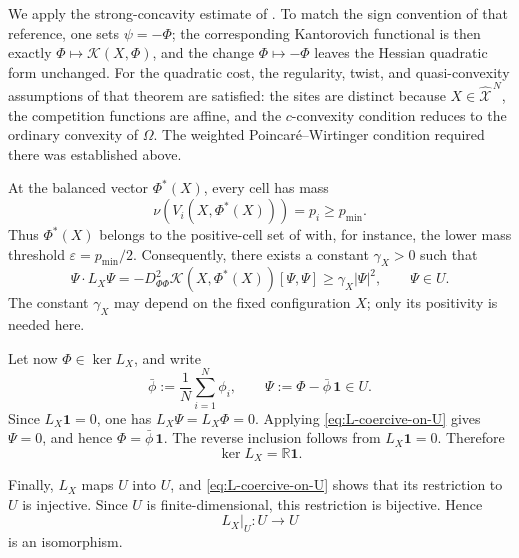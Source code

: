 \documentclass[11pt]{article}
\def\R{\mathbb{R}}
\def\Xc{{\mathcal X}}
\def\hX{\widehat{\Xc}^{\,N}}
\newcommand{\one}{\mathbf 1}
\newcommand{\Kant}{\mathscr K}
\newcommand{\pmin}{p_{\min}}
\theoremstyle{definition}
\theoremstyle{remark}
\numberwithin{equation}{section}
\begin{document}
We apply the strong-concavity estimate of
\cite[Theorem~5.1]{KitagawaMerigotThibert2019}.  To match the sign
convention of that reference, one sets $\psi=-\Phi$; the corresponding
Kantorovich functional is then exactly
$\Phi\mapsto\Kant(X,\Phi)$, and the change $\Phi\mapsto-\Phi$ leaves
the Hessian quadratic form unchanged.  For the quadratic cost, the
regularity, twist, and quasi-convexity assumptions of that theorem are
satisfied: the sites are distinct because $X\in\hX$, the competition
functions are affine, and the $c$-convexity condition reduces to the
ordinary convexity of $\Omega$.  The weighted
Poincar\'e--Wirtinger condition required there was established above.

At the balanced vector $\Phi^*(X)$, every cell has mass
\[
 \nu(V_i(X,\Phi^*(X)))=p_i\ge\pmin.
\]
Thus $\Phi^*(X)$ belongs to the positive-cell set of
\cite[Theorem~5.1]{KitagawaMerigotThibert2019} with, for instance,
the lower mass threshold $\varepsilon=\pmin/2$.  Consequently, there
exists a constant $\gamma_X>0$ such that
\begin{equation}\label{eq:L-coercive-on-U}
 \Psi\cdot L_X\Psi
 =
 -D_{\Phi\Phi}^2\Kant(X,\Phi^*(X))[\Psi,\Psi]
 \ge
 \gamma_X|\Psi|^2,
 \qquad
 \Psi\in U.
\end{equation}
The constant $\gamma_X$ may depend on the fixed configuration $X$;
only its positivity is needed here.

Let now $\Phi\in\ker L_X$, and write
\[
 \bar\phi:=\frac1N\sum_{i=1}^N\phi_i,
 \qquad
 \Psi:=\Phi-\bar\phi\,\one\in U.
\]
Since $L_X\one=0$, one has $L_X\Psi=L_X\Phi=0$.  Applying
\eqref{eq:L-coercive-on-U} gives $\Psi=0$, and hence
$\Phi=\bar\phi\,\one$.  The reverse inclusion follows from
$L_X\one=0$.  Therefore
\begin{equation}\label{eq:L-kernel-main}
 \ker L_X=\R\one.
\end{equation}

Finally, $L_X$ maps $U$ into $U$, and
\eqref{eq:L-coercive-on-U} shows that its restriction to $U$ is
injective.  Since $U$ is finite-dimensional, this restriction is
bijective.  Hence
\begin{equation}\label{eq:L-isomorphism-main}
 L_X|_U:U\longrightarrow U
\end{equation}
is an isomorphism.
\end{document}
